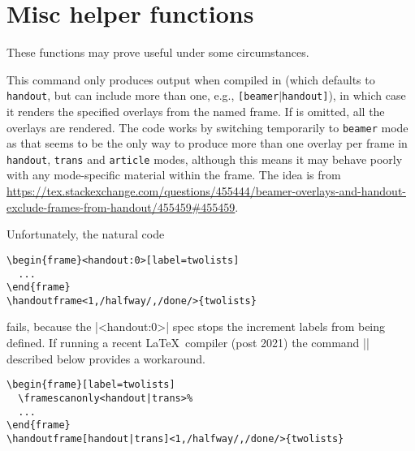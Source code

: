 \documentclass[a4paper]{ltxdoc}
\begin{document}
\section{Misc helper functions}\label{sec:helper}

These functions may prove useful under some circumstances.

\begin{command}{\handoutframe{}}
  This command only produces output when compiled in  (which
  defaults to \texttt{handout}, but can include more than one, e.g.,
  \texttt{[beamer$\mid$handout]}), in which case it renders the specified
  overlays from the named frame.  If  is omitted,
  all the overlays are rendered.  The code works by switching temporarily to
  \texttt{beamer} mode as that seems to be the only way to produce more than one
  overlay per frame in \texttt{handout}, \texttt{trans} and \texttt{article}
  modes, although this means it may behave poorly with any mode-specific
  material within the frame.  The idea is from
  \url{https://tex.stackexchange.com/questions/455444/beamer-overlays-and-handout-exclude-frames-from-handout/455459#455459}.
\end{command}

Unfortunately,  the natural code
\example
\begin{verbatim}
\begin{frame}<handout:0>[label=twolists]
  ...
\end{frame}
\handoutframe<1,/halfway/,/done/>{twolists}
\end{verbatim}
fails, because the |<handout:0>| spec stops the increment labels from being
defined.  If running a recent \LaTeX\ compiler (post 2021) the command
|| described below provides a workaround.
\example
\begin{verbatim}
\begin{frame}[label=twolists]
  \framescanonly<handout|trans>%
  ...
\end{frame}
\handoutframe[handout|trans]<1,/halfway/,/done/>{twolists}
\end{verbatim}
\end{document}
